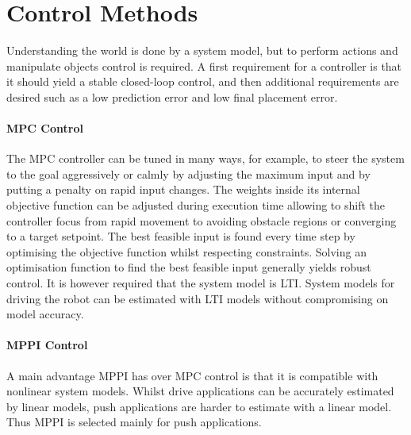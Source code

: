 \section{Control Methods}%
\label{sec:control_methods}
Understanding the world is done by a system model, but to perform actions and manipulate objects control is required. A first requirement for a controller is that it should yield a stable closed-loop control, and then additional requirements are desired such as a low prediction error and low final placement error.

\paragraph{\acs{MPC} Control}
The \ac{MPC} controller can be tuned in many ways, for example, to steer the system to the goal aggressively or calmly by adjusting the maximum input and by putting a penalty on rapid input changes. The weights inside its internal objective function can be adjusted during execution time allowing to shift the controller focus from rapid movement to avoiding obstacle regions or converging to a target setpoint. The best feasible input is found every time step by optimising the objective function whilst respecting constraints. Solving an optimisation function to find the best feasible input generally yields robust control. It is however required that the system model is \ac{LTI}. System models for driving the robot can be estimated with \ac{LTI} models without compromising on model accuracy.

\paragraph{\acs{MPPI} Control}
A main advantage \ac{MPPI} has over \ac{MPC} control is that it is compatible with nonlinear system models. Whilst drive applications can be accurately estimated by linear models, push applications are harder to estimate with a linear model. Thus \ac{MPPI} is selected mainly for push applications.

